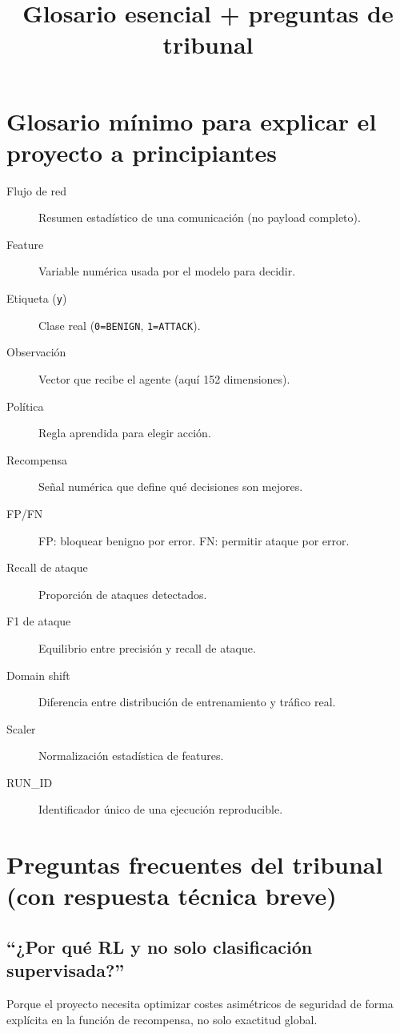 ﻿\documentclass[12pt,a4paper]{article}
\title{Glosario esencial + preguntas de tribunal}
\date{}
\begin{document}
\maketitle

\section{Glosario mínimo para explicar el proyecto a principiantes}

\begin{description}
  \item[Flujo de red] Resumen estadístico de una comunicación (no payload completo).
  \item[Feature] Variable numérica usada por el modelo para decidir.
  \item[Etiqueta (\texttt{y})] Clase real (\texttt{0=BENIGN}, \texttt{1=ATTACK}).
  \item[Observación] Vector que recibe el agente (aquí 152 dimensiones).
  \item[Política] Regla aprendida para elegir acción.
  \item[Recompensa] Señal numérica que define qué decisiones son mejores.
  \item[FP/FN] FP: bloquear benigno por error. FN: permitir ataque por error.
  \item[Recall de ataque] Proporción de ataques detectados.
  \item[F1 de ataque] Equilibrio entre precisión y recall de ataque.
  \item[Domain shift] Diferencia entre distribución de entrenamiento y tráfico real.
  \item[Scaler] Normalización estadística de features.
  \item[RUN\_ID] Identificador único de una ejecución reproducible.
\end{description}

\section{Preguntas frecuentes del tribunal (con respuesta técnica breve)}

\subsection{``¿Por qué RL y no solo clasificación supervisada?''}

Porque el proyecto necesita optimizar costes asimétricos de seguridad de forma explícita en la
función de recompensa, no solo exactitud global.
\end{document}

